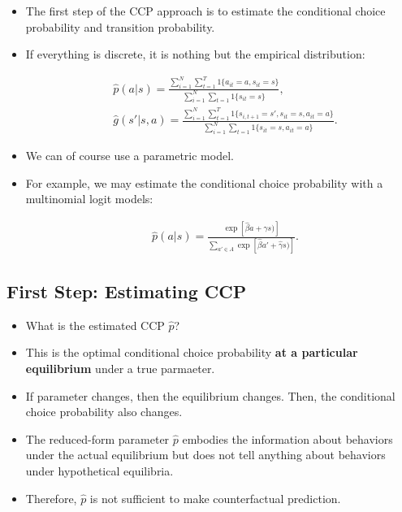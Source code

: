 \documentclass[]{book}
\providecommand{\tightlist}{%
  \setlength{\itemsep}{0pt}\setlength{\parskip}{0pt}}
\begin{document}
\begin{itemize}
\tightlist
\item
  The first step of the CCP approach is to estimate the conditional
  choice probability and transition probability.
\item
  If everything is discrete, it is nothing but the empirical
  distribution:

  \begin{equation}
  \begin{split}
  &\hat{p}(a|s) = \frac{\sum_{i = 1}^N \sum_{t = 1}^T 1\{a_{it} = a, s_{it} = s\}}{\sum_{i = 1}^N \sum_{t = 1} 1\{s_{it} = s\}},\\
  &\hat{g}(s'|s, a) = \frac{\sum_{i = 1}^N \sum_{t = 1}^T 1\{s_{i, t + 1} = s', s_{it} = s, a_{it} = a\}}{\sum_{i = 1}^N \sum_{t = 1} 1\{s_{it} = s, a_{it} = a\}}.
  \end{split}
  \end{equation}
\item
  We can of course use a parametric model.
\item
  For example, we may estimate the conditional choice probability with a
  multinomial logit models:

  \begin{equation}
  \begin{split}
  &\hat{p}(a|s) = \frac{\exp[\hat{\beta} a + \hat{\gamma} s)]}{\sum_{a' \in A} \exp[\hat{\beta} a' + \hat{\gamma} s)]}.
  \end{split}
  \end{equation}
\end{itemize}

\subsection{First Step: Estimating
CCP}\label{first-step-estimating-ccp-1}

\begin{itemize}
\tightlist
\item
  What is the estimated CCP \(\hat{p}\)?
\item
  This is the optimal conditional choice probability \textbf{at a
  particular equilibrium} under a true parmaeter.
\item
  If parameter changes, then the equilibrium changes. Then, the
  conditional choice probability also changes.
\item
  The reduced-form parameter \(\hat{p}\) embodies the information about
  behaviors under the actual equilibrium but does not tell anything
  about behaviors under hypothetical equilibria.
\item
  Therefore, \(\hat{p}\) is not sufficient to make counterfactual
  prediction.
\end{itemize}
\end{document}
